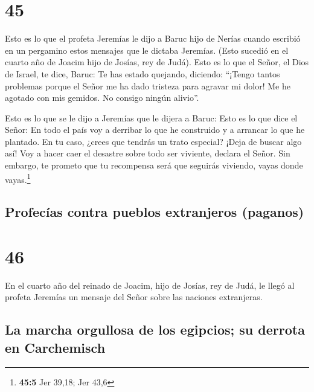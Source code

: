 \hypertarget{section-44}{%
\section{45}\label{section-44}}

 Esto es lo que el profeta Jeremías le dijo a Baruc hijo
de Nerías cuando escribió en un pergamino estos mensajes que le dictaba
Jeremías. (Esto sucedió en el cuarto año de Joacim hijo de Josías, rey
de Judá).  Esto es lo que el Señor, el Dios de Israel, te
dice, Baruc:  Te has estado quejando, diciendo: ``¡Tengo
tantos problemas porque el Señor me ha dado tristeza para agravar mi
dolor! Me he agotado con mis gemidos. No consigo ningún alivio''.

 Esto es lo que se le dijo a Jeremías que le dijera a
Baruc: Esto es lo que dice el Señor: En todo el país voy a derribar lo
que he construido y a arrancar lo que he plantado.  En tu
caso, ¿crees que tendrás un trato especial? ¡Deja de buscar algo así!
Voy a hacer caer el desastre sobre todo ser viviente, declara el Señor.
Sin embargo, te prometo que tu recompensa será que seguirás viviendo,
vayas donde vayas.\footnote{\textbf{45:5} Jer 39,18; Jer 43,6}

\hypertarget{profecuxedas-contra-pueblos-extranjeros-paganos}{%
\subsection{Profecías contra pueblos extranjeros
(paganos)}\label{profecuxedas-contra-pueblos-extranjeros-paganos}}

\hypertarget{section-45}{%
\section{46}\label{section-45}}

 En el cuarto año del reinado de Joacim, hijo de Josías,
rey de Judá, le llegó al profeta Jeremías un mensaje del Señor sobre las
naciones extranjeras.

\hypertarget{la-marcha-orgullosa-de-los-egipcios-su-derrota-en-carchemisch}{%
\subsection{La marcha orgullosa de los egipcios; su derrota en
Carchemisch}\label{la-marcha-orgullosa-de-los-egipcios-su-derrota-en-carchemisch}}

